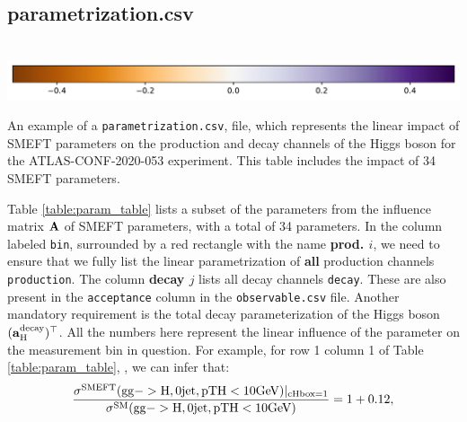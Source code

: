 \documentclass[12pt]{article}
\newlength{\mywidth}\setlength{\mywidth}{14.5cm}
\def\b#1{\boldsymbol{\rm #1}}
\newcommand{\SM}{\text{SM}}
\begin{document}
 \subsection{parametrization.csv}
 \begin{table}
   \resizebox{\textwidth}{!}{
     
     }\\
     \includegraphics{colorbar_param_example.pdf}\\
     \caption{An example of a \texttt{parametrization.csv}, file, which represents the linear impact of SMEFT parameters on the production and decay channels of the Higgs boson for the ATLAS-CONF-2020-053 \cite{ATLAS:2020naq} experiment. This table includes the impact of 34 SMEFT parameters. \label{table:param_table}}
 \end{table}
 Table \ref{table:param_table} lists a subset of the parameters from the influence matrix $\b A$ of SMEFT parameters, with a total of 34 parameters. In the column labeled \verb|bin|, surrounded by a red rectangle with the name {\color{red}\textbf{prod. $i$}}, we need to ensure that we fully list the linear parametrization of \textbf{all} production channels \verb|production|. The column {\color{red}\textbf{decay $j$}} lists all decay channels \verb|decay|. These are also present in the \verb|acceptance| column in the \verb|observable.csv| file. Another mandatory requirement is the total decay parameterization of the Higgs boson $(\b{a}_{\rm H}^{\rm decay})^\top$. All the numbers here represent the linear influence of the parameter on the measurement bin in question. For example, for row 1 column 1 of Table \ref{table:param_table}, , we can infer that:
 \begin{align}
   \rm \frac{\sigma^{SMEFT}(gg->H,0jet,pTH<10GeV)|_{cHbox=1}}{\sigma^\SM(gg->H,0jet,pTH<10GeV)}= 1+0.12,
 \end{align}
\end{document}
